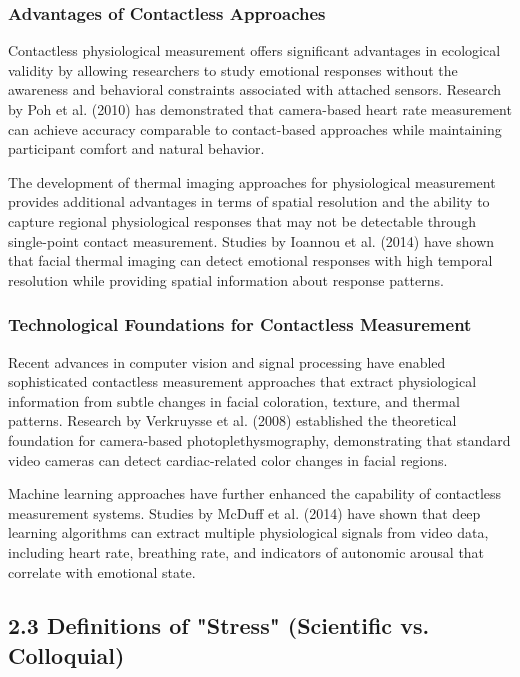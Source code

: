 \documentclass[12pt,a4paper]{article}
\begin{document}
\subsubsection{Advantages of Contactless Approaches}

Contactless physiological measurement offers significant advantages in ecological validity by allowing researchers to
study emotional responses without the awareness and behavioral constraints associated with attached sensors. Research by
Poh et al. (2010) has demonstrated that camera-based heart rate measurement can achieve accuracy comparable to
contact-based approaches while maintaining participant comfort and natural behavior.

The development of thermal imaging approaches for physiological measurement provides additional advantages in terms of
spatial resolution and the ability to capture regional physiological responses that may not be detectable through
single-point contact measurement. Studies by Ioannou et al. (2014) have shown that facial thermal imaging can detect
emotional responses with high temporal resolution while providing spatial information about response patterns.

\subsubsection{Technological Foundations for Contactless Measurement}

Recent advances in computer vision and signal processing have enabled sophisticated contactless measurement approaches
that extract physiological information from subtle changes in facial coloration, texture, and thermal patterns. Research
by Verkruysse et al. (2008) established the theoretical foundation for camera-based photoplethysmography, demonstrating
that standard video cameras can detect cardiac-related color changes in facial regions.

Machine learning approaches have further enhanced the capability of contactless measurement systems. Studies by McDuff
et al. (2014) have shown that deep learning algorithms can extract multiple physiological signals from video data,
including heart rate, breathing rate, and indicators of autonomic arousal that correlate with emotional state.

\subsection{2.3 Definitions of "Stress" (Scientific vs. Colloquial)}
\end{document}

